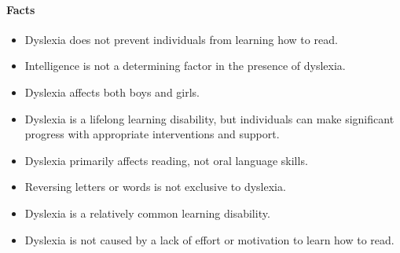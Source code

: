 \paragraph{\textbf{Facts}}
\begin{itemize}
    \item Dyslexia does not prevent individuals from learning how to read. \cite{dyslexiaCharAndSigns}
    \item Intelligence is not a determining factor in the presence of dyslexia. \cite{dyslexiaStatistics}
    \item Dyslexia affects both boys and girls. \cite{dyslexiaCharAndSigns}
    \item Dyslexia is a lifelong learning disability, but individuals can make significant progress with appropriate interventions and support. \cite{dyslexiaCharAndSigns}
    \item Dyslexia primarily affects reading, not oral language skills. \cite{dyslexiaCharAndSigns}
    \item Reversing letters or words is not exclusive to dyslexia. \cite{dyslexiaCharAndSigns}
    \item Dyslexia is a relatively common learning disability.
    \item Dyslexia is not caused by a lack of effort or motivation to learn how to read.
\end{itemize}

